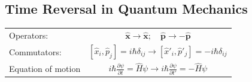 \documentclass[a0,portrait]{a0poster}
\newcommand{\vect}[1]{\boldsymbol{#1}}
\begin{document}
\begin{multicols}{2}
%
%
%





\color{DarkRed}

\section*{Time Reversal in Quantum Mechanics}

\begin{center}
	\begin{xtabular}{l|c}
	\toprule
	Operators: & $ \vect{\hat{x}} \rightarrow \vect{\hat{x}}; \quad \vect{\hat{p}} \rightarrow -\vect{\hat{p}} $ \\
	Commutators: & 	$ \left[ \hat{x}_i, \hat{p}_j \right] = i \hbar \delta_{ij} \rightarrow \left[\hat{x}'_i, \hat{p}'_j \right] = - i \hbar \delta_{ij} $ \\
	Equation of motion & $ i \hbar \frac{\partial \psi}{\partial t} =  \hat{H} \psi \rightarrow i \hbar \frac{\partial \psi}{\partial t'} =  - \hat{H} \psi $ \\
	\bottomrule
	\end{xtabular}
\end{center}


\end{multicols}
\end{document}
